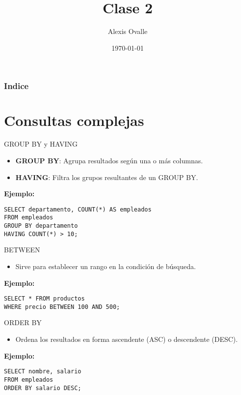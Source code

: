 \documentclass[spanish]{beamer}
\title{Clase 2}
\author{Alexis Ovalle}
\date{\today}
\begin{document}
\begin{frame}
    \titlepage
\end{frame}

\begin{frame}
\frametitle{Indice}
\tableofcontents
\end{frame}

\section{Consultas complejas}



\begin{frame}{GROUP BY y HAVING}
    \begin{itemize}
        \item \textbf{GROUP BY}: Agrupa resultados según una o más columnas.
        \item \textbf{HAVING}: Filtra los grupos resultantes de un GROUP BY.
    \end{itemize}
    \vspace{0.3cm}
    \textbf{Ejemplo:}
    \begin{verbatim}
SELECT departamento, COUNT(*) AS empleados
FROM empleados
GROUP BY departamento
HAVING COUNT(*) > 10;
    \end{verbatim}
\end{frame}

\begin{frame}{BETWEEN}
    \begin{itemize}
        \item Sirve para establecer un rango en la condición de búsqueda.
    \end{itemize}
    \vspace{0.3cm}
    \textbf{Ejemplo:}
    \begin{verbatim}
SELECT * FROM productos
WHERE precio BETWEEN 100 AND 500;
    \end{verbatim}
\end{frame}

\begin{frame}{ORDER BY}
    \begin{itemize}
        \item Ordena los resultados en forma ascendente (ASC) o descendente (DESC).
    \end{itemize}
    \vspace{0.3cm}
    \textbf{Ejemplo:}
    \begin{verbatim}
SELECT nombre, salario
FROM empleados
ORDER BY salario DESC;
    \end{verbatim}
\end{frame}
\end{document}
